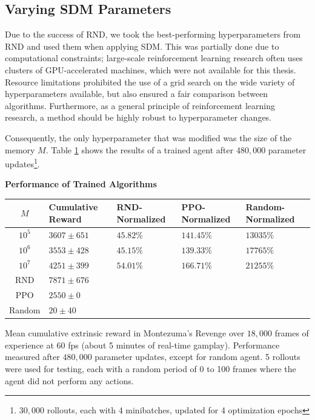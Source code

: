 \documentclass[journal, onecolumn, 12pt, draftclsnofoot]{IEEEtran}
\begin{document}
	\subsection{Varying SDM Parameters}
	\par Due to the success of RND, we took the best-performing hyperparameters from RND and used them when applying SDM. This was partially done due to computational constraints; large-scale reinforcement learning research often uses clusters of GPU-accelerated machines, which were not available for this thesis. Resource limitations prohibited the use of a grid search on the wide variety of hyperparameters available, but also ensured a fair comparison between algorithms. Furthermore, as a general principle of reinforcement learning research, a method should be highly robust to hyperparameter changes.
	\par Consequently, the only hyperparameter that was modified was the size of the memory $M$. Table \ref{tbl:results} shows the results of a trained agent after $480,000$ parameter updates\footnote{$30,000$ rollouts, each with 4 minibatches, updated for 4 optimization epochs}.
	\begin{table}[ht]
		\begin{center}
	\textbf{Performance of Trained Algorithms} \\ \medskip
	\label{tbl:results}
	\begin{tabular}{c |p{2cm} p{2cm} p{2cm} p{2cm}}
		$M$ & Cumulative Reward & RND-Normalized & PPO-Normalized & Random-Normalized \\ \hline
		$10^5$ & $3607 \pm 651$ & $45.82\%$ & $141.45\%$ & $13035\%$\\
		$10^6$ & $3553 \pm 428$ & $45.15\%$ & $139.33\%$ & $17765\%$\\
		$10^7$ & $4251 \pm 399$ & $54.01\%$ & $166.71\%$ & $21255\%$\\
		\hline
		RND & $7871 \pm 676$ & & & \\
		PPO & $2550 \pm 0$ & & & \\
		Random & $20 \pm 40$ & & & \\
	\end{tabular}
	\end{center}
	Mean cumulative extrinsic reward in Montezuma's Revenge over $18,000$ frames of experience at $60$ fps (about 5 minutes of real-time gamplay). Performance measured after $480,000$ parameter updates, except for random agent. 5 rollouts were used for testing, each with a random period of 0 to 100 frames where the agent did not perform any actions.
	\end{table}
\end{document}
